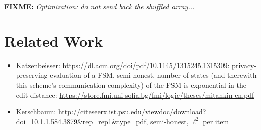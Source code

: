 \documentclass{article}
\newcommand{\fixme}[1]{{\bf FIXME:} {\emph{#1}}}
\begin{document}
\fixme{Optimization: do not send back the shuffled array...}

\section{Related Work}
\begin{itemize}
\item Katzenbeisser: \url{https://dl.acm.org/doi/pdf/10.1145/1315245.1315309}:
  privacy-preserving evaluation of a FSM, semi-honest, number of
  states (and therewith this scheme's communication complexity) of the
  FSM is exponential in the edit distance:
  \url{https://store.fmi.uni-sofia.bg/fmi/logic/theses/mitankin-en.pdf}
\item Kerschbaum: \url{http://citeseerx.ist.psu.edu/viewdoc/download?doi=10.1.1.584.3879&rep=rep1&type=pdf}, semi-honest, $\ell^2$ per item
\end{itemize}
  
\end{document}
